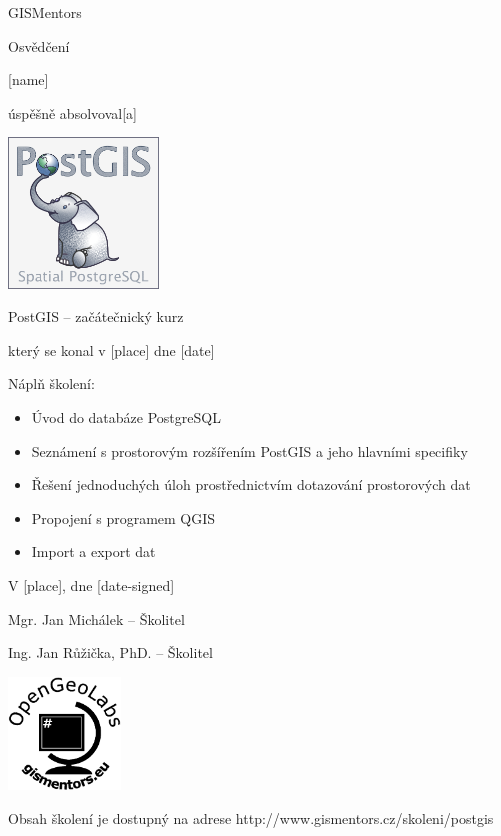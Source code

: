 \documentclass[12pt, a4paper]{letter}
\begin{document}
\pagestyle{empty}
\begin{center}

{\Large GISMentors}

{\Huge Osvědčení}

{\Large [name]}

úspěšně absolvoval[a]

\includegraphics[width=0.30\textwidth]{../images/postgis.png}

{\Large PostGIS -- začátečnický kurz}

který se konal v [place] dne [date]
\end{center}

Náplň školení:

\begin{itemize}
    \item Úvod do databáze PostgreSQL
    \item Seznámení s prostorovým rozšířením PostGIS a jeho hlavními specifiky
    \item Řešení jednoduchých úloh prostřednictvím dotazování prostorových dat
    \item Propojení s programem QGIS
    \item Import a export dat
\end{itemize}

\vfill
\parbox{7cm}{

    V [place], dne [date-signed]\\

\vfill

    Mgr. Jan Michálek -- Školitel \\

\vfill

    Ing. Jan Růžička, PhD. -- Školitel
}
\hfill
\parbox{3cm}{
    \includegraphics[width=3cm]{../images/placka.eps}
}

\vfill

\begin{center}
{\footnotesize Obsah školení je dostupný na adrese
http://www.gismentors.cz/skoleni/postgis}
\end{center}
\end{document}
